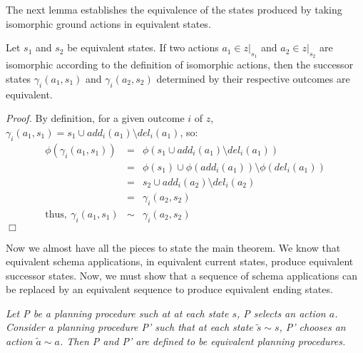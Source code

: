   
 
The next lemma establishes the equivalence
of the states produced by taking isomorphic ground actions in equivalent states.

\begin{lemma}\label{lemma1} Let ${s_1}$ and ${s_2}$ be equivalent states.
If two actions  $a_1 \in  z|_{s_1}$ and $a_2 \in z|_{s_2}$ 
  are isomorphic according to the definition of isomorphic actions, then the successor states $\gamma_i(a_1, s_1)$ and 
  $\gamma_i(a_2, s_2)$ determined
 by their respective outcomes are equivalent.
\end{lemma}

\vspace{0in}\emph{Proof.} By definition, for a given outcome $i$ of $z$, $\gamma_i(a_1, s_1) = s_1 \cup add_i(a_1) \setminus
del_i(a_1)$, so:
\begin{eqnarray*}
\phi(\gamma_i(a_1, s_1)) & = & \phi( s_1 \cup add_i(a_1) \setminus del_i(a_1)) \\
& = & \phi( s_1 ) \cup  \phi(add_i(a_1)) \setminus \phi(del_i(a_1))\\
& = & s_2 \cup add_i(a_2) \setminus del_i(a_2)\\
& = & \gamma_i(a_2, s_2)\\
\mathrm{thus,}\ \gamma_i(a_1, s_1) & \sim & \gamma_i(a_2, s_2)
\end{eqnarray*}
\hfill$\Box$


Now we almost have all the pieces to state the main theorem. We know that
equivalent schema applications, in equivalent current states, produce equivalent successor
states. Now, we must show that a sequence of schema applications can
be replaced by an equivalent sequence to produce equivalent ending states.
\vspace{.3in}
\begin{defn} \emph{
    Let P be a planning procedure such at at each state $s$, P selects
    an action $a$. Consider a planning procedure P' such that at each
    state $\tilde{s} \sim s$, P' chooses an action $\tilde{a} \sim
    {a}$. Then P and P' are defined to be \emph{equivalent planning
    procedures}.
}\label{eqplanners}\end{defn}

